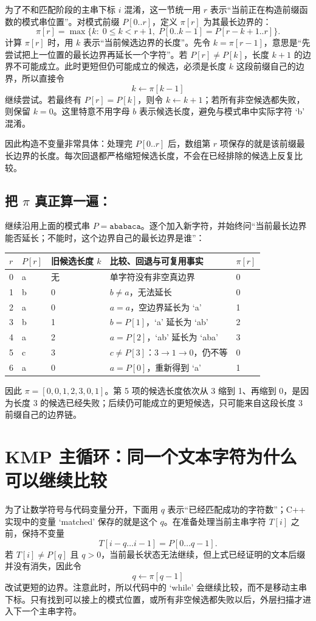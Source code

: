 \documentclass[UTF8,fontset=none,11pt,a4paper]{ctexart}
\begin{document}
为了不和匹配阶段的主串下标 $i$ 混淆，这一节统一用 $r$ 表示“当前正在构造前缀函数的模式串位置”。对模式前缀 $P[0..r]$，定义 $\pi[r]$ 为其最长边界的：
\[
\pi[r]=\max\{k:\;0\le k<r+1,\;P[0..k-1]=P[r-k+1..r]\}.
\]
计算 $\pi[r]$ 时，用 $k$ 表示“当前候选边界的长度”。先令 $k=\pi[r-1]$，意思是“先尝试把上一位置的最长边界再延长一个字符”。若 $P[r]\ne P[k]$，长度 $k+1$ 的边界不可能成立。此时更短但仍可能成立的候选，必须是长度 $k$ 这段前缀自己的边界，所以直接令
\[
k\leftarrow\pi[k-1]
\]
继续尝试。若最终有 $P[r]=P[k]$，则令 $k\leftarrow k+1$；若所有非空候选都失败，则保留 $k=0$。这里特意不用字母 $b$ 表示候选长度，避免与模式串中实际字符 `b' 混淆。

因此构造不变量非常具体：处理完 $P[0..r]$ 后，数组第 $r$ 项保存的就是该前缀最长边界的长度。每次回退都严格缩短候选长度，不会在已经排除的候选上反复比较。

\subsection{把 \texorpdfstring{$\pi$}{pi} 真正算一遍：}
继续沿用上面的模式串 $P=\texttt{ababaca}$。逐个加入新字符，并始终问“当前最长边界能否延长；不能时，这个边界自己的最长边界是谁”：
\begin{center}\small
\begin{tabularx}{\linewidth}{C{0.8cm}C{1.1cm}L{2.7cm}Y C{1.1cm}}
\toprule
$r$ & $P[r]$ & 旧候选长度 $k$ & 比较、回退与可复用事实 & $\pi[r]$\\
 & a & 无 & 单字符没有非空真边界 & 0\\
1 & b & 0 & $b\ne a$，无法延长 & 0\\
2 & a & 0 & $a=a$，空边界延长为 `a' & 1\\
3 & b & 1 & $b=P[1]$，`a' 延长为 `ab' & 2\\
4 & a & 2 & $a=P[2]$，`ab' 延长为 `aba' & 3\\
5 & c & 3 & $c\ne P[3]$：$3\to1\to0$，仍不等 & 0\\
6 & a & 0 & $a=P[0]$，重新得到 `a' & 1\\
\bottomrule
\end{tabularx}
\end{center}
因此 $\pi=[0,0,1,2,3,0,1]$。第 5 项的候选长度依次从 3 缩到 1、再缩到 0，是因为长度 3 的候选已经失败；后续仍可能成立的更短候选，只可能来自这段长度 3 前缀自己的边界链。

\section{KMP 主循环：同一个文本字符为什么可以继续比较}
为了让数学符号与代码变量分开，下面用 $q$ 表示“已经匹配成功的字符数”；C++ 实现中的变量 `matched' 保存的就是这个 $q$。在准备处理当前主串字符 $T[i]$ 之前，保持不变量
\[
T[i-q\ldots i-1]=P[0\ldots q-1].
\]
若 $T[i]\ne P[q]$ 且 $q>0$，当前最长状态无法继续，但上式已经证明的文本后缀并没有消失，因此令
\[
q\leftarrow\pi[q-1]
\]
改试更短的边界。注意此时，所以代码中的 `while' 会继续比较，而不是移动主串下标。只有找到可以接上的模式位置，或所有非空候选都失败以后，外层扫描才进入下一个主串字符。
\end{document}
